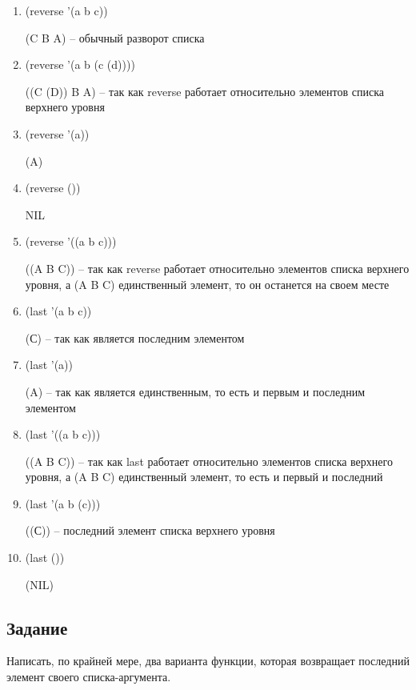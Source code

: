 \begin{enumerate} 

\item (reverse '(a b c)) 

(C B A) -- обычный разворот списка

\item (reverse '(a b (c (d)))) 

((C (D))  B A)  -- так как reverse работает относительно элементов списка верхнего уровня

\item (reverse '(a)) 

(A)
\item (reverse ())

NIL

\item (reverse '((a b c)))

((A B C)) -- так как reverse работает относительно элементов списка верхнего уровня, а (A B C) единственный элемент, то он останется на своем месте

\item (last '(a b c))

(С) -- так как является последним элементом

\item (last '(a))

(A) -- так как является единственным, то есть и первым и последним элементом

\item (last '((a b c)))

((A B C)) -- так как last работает относительно элементов списка верхнего уровня, а (A B C) единственный элемент, то есть и первый и последний

\item (last '(a b (c))) 

((С)) -- последний элемент списка верхнего уровня

\item (last ())

(NIL)

\end{enumerate} 

\subsection{Задание }

Написать, по крайней мере, два варианта функции, которая возвращает последний элемент своего списка-аргумента.

 

